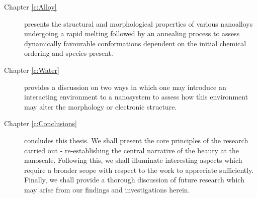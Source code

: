 \begin{description}
  \item[Chapter \ref{c:Alloy}] presents the structural and morphological properties of various nanoalloys undergoing a rapid melting followed by an annealing process to assess dynamically favourable conformations dependent on the initial chemical ordering and species present.

  \item[Chapter \ref{c:Water}] provides a discussion on two ways in which one may introduce an interacting environment to a nanosystem to assess how this environment may alter the morphology or electronic structure.
  
  \item[Chapter \ref{c:Conclusions}] concludes this thesis. We shall present the core principles of the research carried out - re-establishing the central narrative of the beauty at the nanoscale. Following this, we shall illuminate interesting aspects which require a broader scope with respect to the work to appreciate sufficiently. Finally, we shall provide a thorough discussion of future research which may arise from our findings and investigations herein.
  
\end{description}

